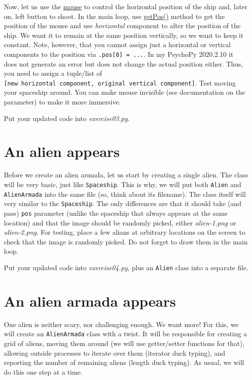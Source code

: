 \documentclass[
]{book}
\begin{document}
Now, let us use the \href{https://psychopy.org/api/event.html\#psychopy.event.Mouse}{mouse} to control the horizontal position of the ship and, later on, left button to shoot. In the main loop, use \href{https://psychopy.org/api/event.html\#psychopy.event.Mouse.getPos}{getPos()} method to get the position of the mouse and use \emph{horizontal} component to alter the position of the ship. We want it to remain at the same position vertically, so we want to keep it constant. Note, however, that you cannot assign just a horizontal or vertical components to the position via \texttt{.pos{[}0{]}\ =\ ...}. In my PsychoPy 2020.2.10 it does not generate an error but does not change the actual position either. Thus, you need to assign a tuple/list of \texttt{{[}new\ horizontal\ component,\ original\ vertical\ component{]}}. Test moving your spaceship around. You can make mouse invisible (see documentation on the parameter) to make it more immersive.

Put your updated code into \emph{exercise03.py}.

\hypertarget{an-alien-appears}{%
\section{An alien appears}\label{an-alien-appears}}

Before we create an alien armada, let us start by creating a single alien. The class will be very basic, just like \texttt{Spaceship}. This is why, we will put both \texttt{Alien} and \texttt{AlienArmada} into the same file (so, think about its filename). The class itself will very similar to the \texttt{Spaceship}. The only differences are that it should take (and pass) \texttt{pos} parameter (unlike the spaceship that always appears at the same location) and that the image should be randomly picked, either \emph{alien-1.png} or \emph{alien-2.png}. For testing, place a few alians at arbitrary locations on the screen to check that the image is randomly picked. Do not forget to draw them in the main loop.

Put your updated code into \emph{exercise04.py}, plus an \texttt{Alien} class into a separate file.

\hypertarget{an-alien-armada-appears}{%
\section{An alien armada appears}\label{an-alien-armada-appears}}

One alien is neither scary, nor challenging enough. We want more! For this, we will create an \texttt{AlienArmada} class with a twist. It will be responsible for creating a grid of aliens, moving them around (we will use getter/setter functions for that), allowing outside processes to iterate over them (iterator duck typing), and reporting the number of remaining aliens (length duck typing). As usual, we will do this one step at a time.
\end{document}
